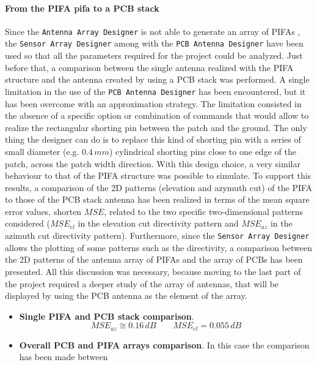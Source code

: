 \documentclass[12pt,a4paper]{article}
\begin{document}
{	\paragraph{\selectfont\color{Turquoise}From the PIFA pifa to a PCB stack}
	Since the \texttt{\color{Mahogany}Antenna Array Designer} is not able to generate an array of PIFAs , the \texttt{\color{Mahogany}Sensor Array Designer} among with the \texttt{\color{Mahogany}PCB Antenna Designer} have been used so that all the parameters required for the project could be analyzed. Just before that, a comparison between the single antenna realized with the PIFA structure and the antenna created by using a PCB stack was performed. A single limitation in the use of the \texttt{\color{Mahogany}PCB Antenna Designer} has been encountered, but it has been overcome with an approximation strategy. The limitation consisted in the absence of a specific option or combination of commands that would allow to realize the rectangular shorting pin between the patch and the ground. The only thing the designer can do is to replace this kind of shorting pin with a series of small diameter (e.g. $0.4\,mm$) cylindrical shorting pins close to one edge of the patch, across the patch width direction. With this design choice, a very similar behaviour to that of the PIFA structure was possible to simulate. To support this results, a comparison of the 2D patterns (elevation and azymuth cut) of the PIFA to those of the PCB stack antenna has been realized in terms of the mean square error values, shorten $MSE$, related to the two specific two-dimensional patterns considered ($MSE_{el}$ in the elevation cut directivity pattern and $MSE_{az}$ in the azimuth cut directivity pattern). Furthermore, since the \texttt{\color{Mahogany}Sensor Array Designer} allows the plotting of some patterns such as the directivity, a comparison between the 2D patterns of the antenna array of PIFAs and the array of PCBs has been presented. All this discussion was necessary, because moving to the last part of the project required a deeper study of the array of antennas, that will be displayed by using the PCB antenna as the element of the array. 
	\begin{itemize}
		\item \textbf{Single PIFA and PCB stack comparison}.
		\begin{equation}
			MSE_{az}\cong 0.16\,dB\qquad MSE_{el}=0.055\,dB
		\end{equation}
		\item \textbf{Overall PCB and PIFA arrays comparison}. In this case the comparison has been made between

\end{itemize}}
\end{document}
